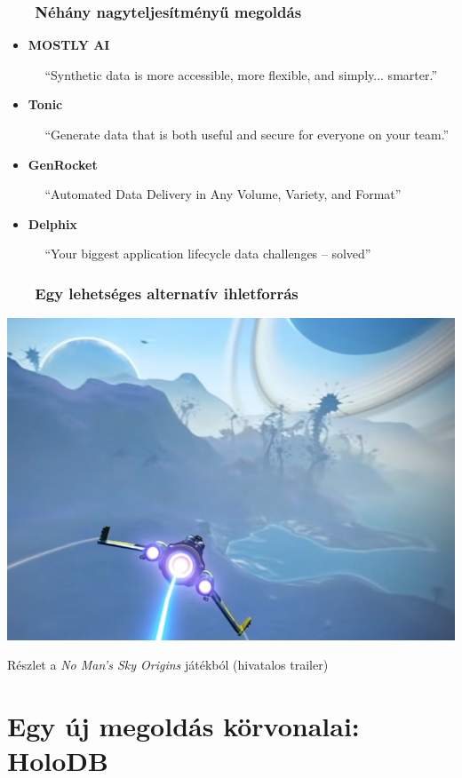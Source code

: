 \documentclass[
]{beamer}
\newcommand{\slidetitle}[2]{\frametitle{{\small #1 ~ \ding{226} ~ } \normalsize \textbf{#2} }}
\begin{document}
\begin{frame}
    \slidetitle{\sectionshorttitle}{Néhány nagyteljesítményű megoldás}
    
    \begin{itemize}
        \setlength\itemsep{1.3em}
        \item \textbf{MOSTLY AI} \par ~~ { \footnotesize
              ``Synthetic data is more accessible, more flexible, and simply... smarter.'' }
        \item \textbf{Tonic} \par ~~ { \footnotesize
              ``Generate data that is both useful and secure for everyone on your team.'' }
        \item \textbf{GenRocket} \par ~~ { \footnotesize
              ``Automated Data Delivery in Any Volume, Variety, and Format'' }
        \item \textbf{Delphix} \par ~~ { \footnotesize
              ``Your biggest application lifecycle data challenges -- solved'' }
    \end{itemize}
\end{frame}

\begin{frame}
    \slidetitle{\sectionshorttitle}{Egy lehetséges alternatív ihletforrás}
    
    \centering
    
    \includegraphics[height=0.55\textwidth]{image/nomanssky.png}
    
    \smallskip
    
    Részlet a \textit{No Man's Sky Origins} játékból (hivatalos trailer)
\end{frame}

\section{Egy új megoldás körvonalai: HoloDB}
\def\sectionshorttitle{HoloDB}
\end{document}

